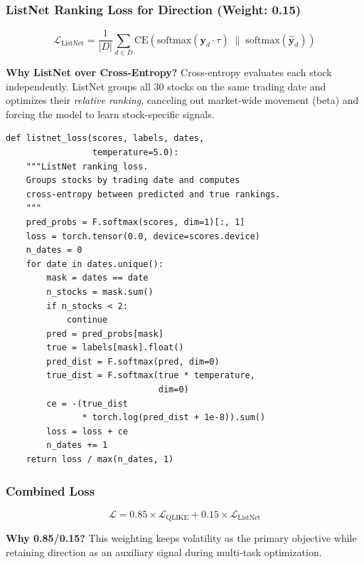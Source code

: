 \documentclass[12pt,a4paper]{article}
\begin{document}
\subsubsection{ListNet Ranking Loss for Direction (Weight: 0.15)}

\begin{equation}
    \mathcal{L}_{\text{ListNet}} = \frac{1}{|D|}\sum_{d \in D} \text{CE}\!\left(\text{softmax}(\mathbf{y}_d \cdot \tau) \;\big\|\; \text{softmax}(\hat{\mathbf{y}}_d)\right)
\end{equation}

\textbf{Why ListNet over Cross-Entropy?} Cross-entropy evaluates each stock independently. ListNet groups all 30 stocks on the same trading date and optimizes their \textit{relative ranking}, canceling out market-wide movement (beta) and forcing the model to learn stock-specific signals.

\begin{lstlisting}[caption={ListNet ranking loss (src/models/losses.py)}]
def listnet_loss(scores, labels, dates,
                 temperature=5.0):
    """ListNet ranking loss.
    Groups stocks by trading date and computes
    cross-entropy between predicted and true rankings.
    """
    pred_probs = F.softmax(scores, dim=1)[:, 1]
    loss = torch.tensor(0.0, device=scores.device)
    n_dates = 0
    for date in dates.unique():
        mask = dates == date
        n_stocks = mask.sum()
        if n_stocks < 2:
            continue
        pred = pred_probs[mask]
        true = labels[mask].float()
        pred_dist = F.softmax(pred, dim=0)
        true_dist = F.softmax(true * temperature,
                              dim=0)
        ce = -(true_dist
               * torch.log(pred_dist + 1e-8)).sum()
        loss = loss + ce
        n_dates += 1
    return loss / max(n_dates, 1)
\end{lstlisting}

\subsubsection{Combined Loss}

\begin{equation}
    \mathcal{L} = 0.85 \times \mathcal{L}_{\text{QLIKE}} + 0.15 \times \mathcal{L}_{\text{ListNet}}
\end{equation}

\textbf{Why 0.85/0.15?} This weighting keeps volatility as the primary objective while retaining direction as an auxiliary signal during multi-task optimization.
\end{document}
